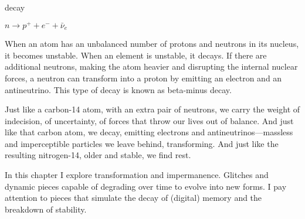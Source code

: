 
\begin{center}
\vspace*{\fill}
\Huge decay

\vspace{2cm}

\begin{flushright}
\large
\textit{ $n \rightarrow p^+ + e^- + \bar{\nu}_e$ }
\end{flushright}

\vspace*{\fill}
\end{center}

\normalsize

When an atom has an unbalanced number of protons and neutrons in its nucleus, it becomes unstable. When an element is unstable, it decays. If there are additional neutrons, making the atom heavier and disrupting the internal nuclear forces, a neutron can transform into a proton by emitting an electron and an antineutrino. This type of decay is known as beta-minus decay.

Just like a carbon-14 atom, with an extra pair of neutrons, we carry the weight of indecision, of uncertainty, of forces that throw our lives out of balance. And just like that carbon atom, we decay, emitting electrons and antineutrinos—massless and imperceptible particles we leave behind, transforming. And just like the resulting nitrogen-14, older and stable, we find rest.

In this chapter I explore transformation and impermanence. Glitches and dynamic pieces capable of degrading over time to evolve into new forms. I pay attention to pieces that simulate the decay of (digital) memory and the breakdown of stability.  


